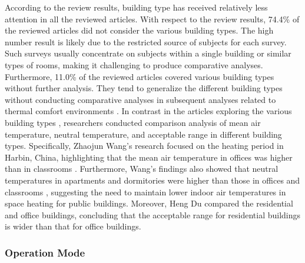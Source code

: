 \documentclass[final,3p,times,12pt]{elsarticle}
\begin{document}
According to the review results, building type has received relatively less attention in all the reviewed articles. With respect to the review results, 74.4\% of the reviewed articles did not consider the various building types. The high number result is likely due to the restricted source of subjects for each survey. Such surveys usually concentrate on subjects within a single building or similar types of rooms, making it challenging to produce comparative analyses. Furthermore, 11.0\% of the reviewed articles covered various building types without further analysis. They tend to generalize the different building types without conducting comparative analyses in subsequent analyses related to thermal comfort environments \cite{humphreysOutdoorTemperaturesComfort1978,yanDifferenceThermalResponse2019,duEvaluationAccuracyPMV2022a}. In contrast in the articles exploring the various building types \cite{mccartneyDevelopingAdaptiveControl2002}, researchers conducted comparison analysis of mean air temperature, neutral temperature, and acceptable range in different building types. Specifically, Zhaojun Wang's research focused on the heating period in Harbin, China, highlighting that the mean air temperature in offices was higher than in classrooms \cite{wangThermalAdaptationThermal2014}. Furthermore, Wang's findings also showed that neutral temperatures in apartments and dormitories were higher than those in offices and classrooms \cite{wangInfluenceOutdoorIndoor2018}, suggesting the need to maintain lower indoor air temperatures in space heating for public buildings. Moreover, Heng Du \cite{duMethodDeterminingAcceptable2021} compared the residential and office buildings, concluding that the acceptable range for residential buildings is wider than that for office buildings. 

\subsubsection{Operation Mode}
\end{document}
